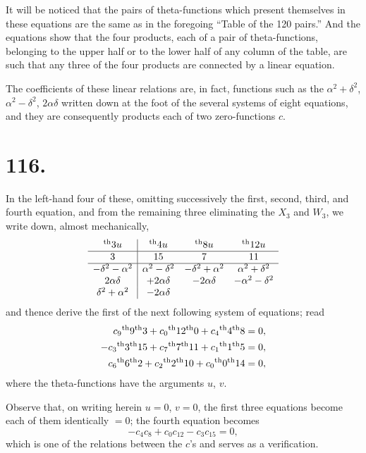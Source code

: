 \documentclass[11pt,a4paper]{book}
\providecommand{\uth}{\textsuperscript{th}}
\begin{document}
It will be noticed that the pairs of theta-functions which present themselves in these equations are the same as in the foregoing ``Table of the 120 pairs.'' And the equations show that the four products, each of a pair of theta-functions, belonging to the upper half or to the lower half of any column of the table, are such that any three of the four products are connected by a linear equation.

The coefficients of these linear relations are, in fact, functions such as the $\alpha^2 + \delta^2$, $\alpha^2 - \delta^2$, $2\alpha\delta$ written down at the foot of the several systems of eight equations, and they are consequently products each of two zero-functions $c$.

\newpage
\section*{116.}
\label{sec:116}

In the left-hand four of these, omitting successively the first, second, third, and fourth equation, and from the remaining three eliminating the $X_3$ and $W_3$, we write down, almost mechanically,
\[
\begin{array}{c|cccc}
\uth{3}u & \uth{4}u & \uth{8}u & \uth{12}u \\
\hline
3 & 15 & 7 & 11 \\
\hline
- \delta^2 - \alpha^2 & \alpha^2 - \delta^2 & -\delta^2 + \alpha^2 & \alpha^2 + \delta^2 \\
2\alpha\delta & +2\alpha\delta & -2\alpha\delta & -\alpha^2 - \delta^2 \\
\delta^2 + \alpha^2 & -2\alpha\delta
\end{array}
\]
and thence derive the first of the next following system of equations; read
\begin{align*}
c_9\uth{9}\uth{3} + c_0\uth{12}\uth{0} + c_4\uth{4}\uth{8} &= 0, \\
-c_3\uth{3}\uth{15} + c_7\uth{7}\uth{11} + c_1\uth{1}\uth{5} &= 0, \\
c_6\uth{6}\uth{2} + c_2\uth{2}\uth{10} + c_0\uth{0}\uth{14} &= 0,
\end{align*}
where the theta-functions have the arguments $u$, $v$.

Observe that, on writing herein $u = 0$, $v = 0$, the first three equations become each of them identically $= 0$; the fourth equation becomes
\[
-c_4c_8 + c_0c_{12} - c_3c_{15} = 0,
\]
which is one of the relations between the $c$'s and serves as a verification.
\end{document}
